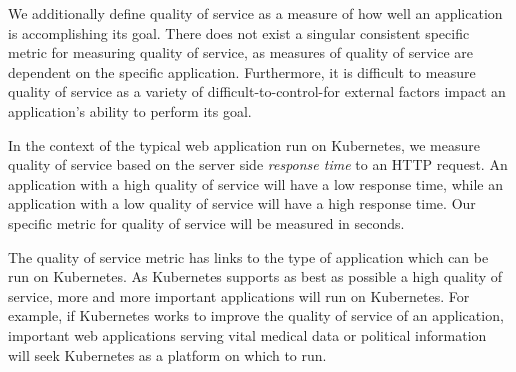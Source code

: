 We additionally define quality of service as a measure of how well an application
is accomplishing its goal. There does not exist a singular consistent specific
metric for measuring quality of service, as measures of quality of service are dependent on
the specific application. Furthermore, it is difficult to measure quality of
service as a variety of difficult-to-control-for external factors impact an
application's ability to perform its goal.

In the context of the typical web application run on Kubernetes, we measure
quality of service based on the server side
\textit{response time} to an HTTP request. An application
with a high quality of service will have a low response time, while an
application with a low quality of service will have a high response time. Our
specific metric for quality of service will be measured in seconds.

The quality of service metric has links to the type of application which can be
run on Kubernetes. As Kubernetes supports as best as possible a high quality of
service, more and more important applications will run on Kubernetes. For
example, if Kubernetes works to improve the quality of service of an
application, important web applications serving vital medical data or political
information will seek Kubernetes as a platform on which to run.
